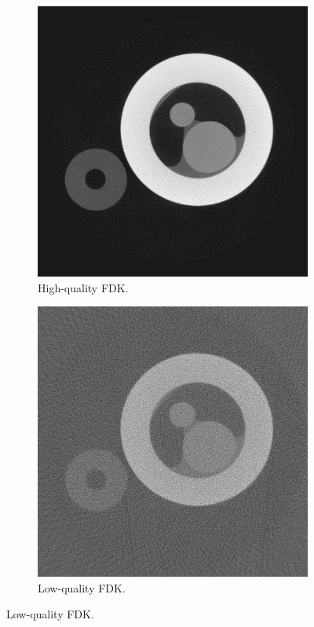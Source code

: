 \begin{figure}
    \begin{subfigure}[t]{.45\textwidth}
      \centering
      \includegraphics[width=\linewidth]{figures/kimrobertgt.png}
      \caption{High-quality FDK. }
    \end{subfigure}
    \hfill
    \begin{subfigure}[t]{.45\textwidth}
      \centering
      \includegraphics[width=\linewidth]{figures/kimrobertFDK.png}
      \caption{Low-quality FDK.}
    \end{subfigure}
  

\end{figure}
